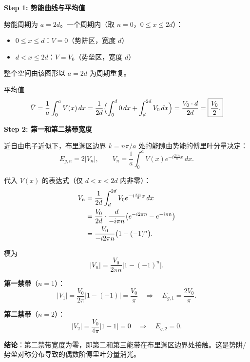 \begin{derivationbox}[标准解题过程]
\textbf{Step 1: 势能曲线与平均值}

势能周期为 $a=2d$。一个周期内（取 $n=0$，$0\le x\le2d$）：
\begin{itemize}
    \item $0\le x\le d$：$V=0$（势阱区，宽度 $d$）
    \item $d<x\le2d$：$V=V_0$（势垒区，宽度 $d$）
\end{itemize}
整个空间由该图形以 $a=2d$ 为周期重复。

平均值
\begin{equation}
\bar{V}=\frac{1}{a}\int_0^a V(x)\,dx=\frac{1}{2d}\Bigl(\int_0^d 0\,dx+\int_d^{2d}V_0\,dx\Bigr)=\frac{V_0\cdot d}{2d}=\boxed{\frac{V_0}{2}.}
\end{equation}

\textbf{Step 2: 第一和第二禁带宽度}

近自由电子近似下，布里渊区边界 $k=n\pi/a$ 处的能隙由势能的傅里叶分量决定：
\begin{equation}
E_{g,n}=2|V_n|,\qquad V_n=\frac{1}{a}\int_0^a V(x)e^{-i\frac{2\pi n}{a}x}\,dx.
\end{equation}

代入 $V(x)$ 的表达式（仅 $d<x<2d$ 内非零）：
\begin{align}
V_n&=\frac{1}{2d}\int_d^{2d}V_0 e^{-i\frac{\pi n}{d}x}\,dx \notag\\
&=\frac{V_0}{2d}\cdot\frac{d}{-i\pi n}\bigl(e^{-i2\pi n}-e^{-i\pi n}\bigr) \notag\\
&=\frac{V_0}{-i2\pi n}\bigl(1-(-1)^n\bigr).
\end{align}

模为
\begin{equation}
|V_n|=\frac{V_0}{2\pi n}\bigl|1-(-1)^n\bigr|.
\end{equation}

\textbf{第一禁带}（$n=1$）：
\begin{equation}
|V_1|=\frac{V_0}{2\pi}|1-(-1)|=\frac{V_0}{\pi}
\quad\Longrightarrow\quad
\boxed{E_{g,1}=\frac{2V_0}{\pi}.}
\end{equation}

\textbf{第二禁带}（$n=2$）：
\begin{equation}
|V_2|=\frac{V_0}{4\pi}|1-1|=0
\quad\Longrightarrow\quad
\boxed{E_{g,2}=0.}
\end{equation}

\textbf{结论}：第二禁带宽度为零，即第二和第三能带在布里渊区边界处接触。这是势阱/势垒对称分布导致的偶数阶傅里叶分量消光。


\end{derivationbox}
